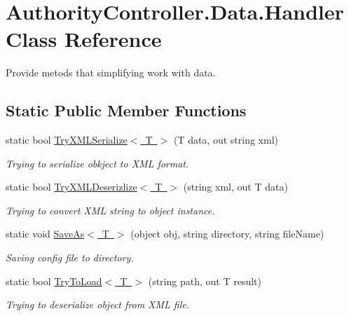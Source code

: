 \hypertarget{class_authority_controller_1_1_data_1_1_handler}{}\section{Authority\+Controller.\+Data.\+Handler Class Reference}
\label{class_authority_controller_1_1_data_1_1_handler}


Provide metods that simplifying work with data.  


\subsection*{Static Public Member Functions}
\begin{DoxyCompactItemize}
\item 
static bool \mbox{\hyperlink{class_authority_controller_1_1_data_1_1_handler_a7f4e5dd2a2f300e566116810897e7f2f}{Try\+X\+M\+L\+Serialize$<$ T $>$}} (T data, out string xml)
\begin{DoxyCompactList}\small\item\em Trying to serialize obkject to X\+ML format. \end{DoxyCompactList}\item 
static bool \mbox{\hyperlink{class_authority_controller_1_1_data_1_1_handler_a086874112fede63b9d3bb8c070698c55}{Try\+X\+M\+L\+Deserizlize$<$ T $>$}} (string xml, out T data)
\begin{DoxyCompactList}\small\item\em Trying to convert X\+ML string to object instance. \end{DoxyCompactList}\item 
static void \mbox{\hyperlink{class_authority_controller_1_1_data_1_1_handler_ae44331f9a2598461455b9f478992e71c}{Save\+As$<$ T $>$}} (object obj, string directory, string file\+Name)
\begin{DoxyCompactList}\small\item\em Saving config file to directory. \end{DoxyCompactList}\item 
static bool \mbox{\hyperlink{class_authority_controller_1_1_data_1_1_handler_aad3bc4d6c6017f4061261f15935da6dc}{Try\+To\+Load$<$ T $>$}} (string path, out T result)
\begin{DoxyCompactList}\small\item\em Trying to deserialize object from X\+ML file. \end{DoxyCompactList}\end{DoxyCompactItemize}



